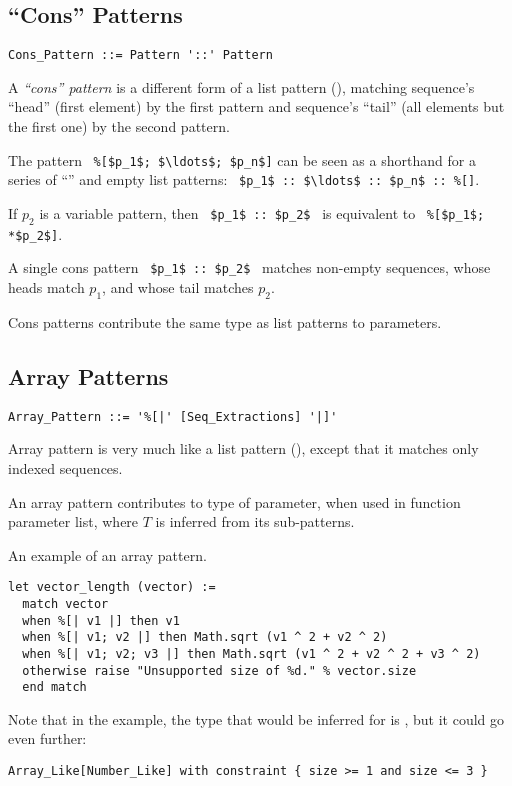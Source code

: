 \subsection{``Cons'' Patterns}
\label{sec:cons-patterns}

\syntax\begin{lstlisting}
Cons_Pattern ::= Pattern '::' Pattern
\end{lstlisting}

A {\em ``cons'' pattern} is a different form of a list pattern (), matching sequence's ``head'' (first element) by the first pattern and sequence's ``tail'' (all elements but the first one) by the second pattern. 

The pattern ~\lstinline!%[$p_1$; $\ldots$; $p_n$]! can be seen as a shorthand for a series of ``\code{::}'' and empty list patterns: ~\lstinline!$p_1$ :: $\ldots$ :: $p_n$ :: %[]!. 

If $p_2$ is a variable pattern, then ~\lstinline!$p_1$ :: $p_2$!~ is equivalent to ~\lstinline!%[$p_1$; *$p_2$]!. 

A single cons pattern ~\lstinline!$p_1$ :: $p_2$!~ matches non-empty sequences, whose heads match $p_1$, and whose tail matches $p_2$. 

Cons patterns contribute the same type as list patterns to parameters. 





\subsection{Array Patterns}
\label{sec:array-patterns}

\syntax\begin{lstlisting}
Array_Pattern ::= '%[|' [Seq_Extractions] '|]'
\end{lstlisting}

Array pattern is very much like a list pattern (), except that it matches only indexed sequences. 

An array pattern contributes  to type of parameter, when used in function parameter list, where $T$ is inferred from its sub-patterns. 

\example An example of an array pattern.
\begin{lstlisting}[deletekeywords={of}]
let vector_length (vector) := 
  match vector 
  when %[| v1 |] then v1
  when %[| v1; v2 |] then Math.sqrt (v1 ^ 2 + v2 ^ 2)
  when %[| v1; v2; v3 |] then Math.sqrt (v1 ^ 2 + v2 ^ 2 + v3 ^ 2)
  otherwise raise "Unsupported size of %d." % vector.size
  end match
\end{lstlisting}
Note that in the example, the type that would be inferred for  is , but it could go even further: 
\begin{lstlisting}Array_Like[Number_Like] with constraint { size >= 1 and size <= 3 }
\end{lstlisting}






